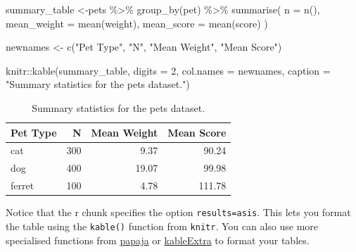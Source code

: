 \documentclass[
  oneside]{book}
\newenvironment{Shaded}{\begin{snugshade}}{\end{snugshade}}
\newcommand{\AttributeTok}[1]{\textcolor[rgb]{0.77,0.63,0.00}{#1}}
\newcommand{\DecValTok}[1]{\textcolor[rgb]{0.00,0.00,0.81}{#1}}
\newcommand{\FunctionTok}[1]{\textcolor[rgb]{0.00,0.00,0.00}{#1}}
\newcommand{\NormalTok}[1]{#1}
\newcommand{\OtherTok}[1]{\textcolor[rgb]{0.56,0.35,0.01}{#1}}
\newcommand{\SpecialCharTok}[1]{\textcolor[rgb]{0.00,0.00,0.00}{#1}}
\newcommand{\StringTok}[1]{\textcolor[rgb]{0.31,0.60,0.02}{#1}}
\begin{document}
\begin{Shaded}
\begin{Highlighting}[]
\NormalTok{summary\_table }\OtherTok{\textless{}{-}}\NormalTok{pets }\SpecialCharTok{\%\textgreater{}\%}
  \FunctionTok{group\_by}\NormalTok{(pet) }\SpecialCharTok{\%\textgreater{}\%}
  \FunctionTok{summarise}\NormalTok{(}
    \AttributeTok{n =} \FunctionTok{n}\NormalTok{(),}
    \AttributeTok{mean\_weight =} \FunctionTok{mean}\NormalTok{(weight),}
    \AttributeTok{mean\_score =} \FunctionTok{mean}\NormalTok{(score)}
\NormalTok{  )}

\NormalTok{newnames }\OtherTok{\textless{}{-}} \FunctionTok{c}\NormalTok{(}\StringTok{"Pet Type"}\NormalTok{, }\StringTok{"N"}\NormalTok{, }\StringTok{"Mean Weight"}\NormalTok{, }\StringTok{"Mean Score"}\NormalTok{)}

\NormalTok{knitr}\SpecialCharTok{::}\FunctionTok{kable}\NormalTok{(summary\_table, }
             \AttributeTok{digits =} \DecValTok{2}\NormalTok{, }
             \AttributeTok{col.names =}\NormalTok{ newnames,}
             \AttributeTok{caption =} \StringTok{"Summary statistics for the pets dataset."}\NormalTok{)}
\end{Highlighting}
\end{Shaded}

\begin{table}

\caption{\label{tab:unnamed-chunk-6}Summary statistics for the pets dataset.}
\centering
\begin{tabular}[t]{l|r|r|r}
\hline
Pet Type & N & Mean Weight & Mean Score\\
\hline
cat & 300 & 9.37 & 90.24\\
\hline
dog & 400 & 19.07 & 99.98\\
\hline
ferret & 100 & 4.78 & 111.78\\
\hline
\end{tabular}
\end{table}

\begin{info}
Notice that the r chunk specifies the option \texttt{results=\textquotesingle{}asis\textquotesingle{}}. This lets you format the table using the \texttt{kable()} function from \texttt{knitr}. You can also use more specialised functions from \href{https://crsh.github.io/papaja_man/reporting.html\#tables}{papaja} or \href{https://haozhu233.github.io/kableExtra/awesome_table_in_html.html}{kableExtra} to format your tables.

\end{info}
\end{document}
